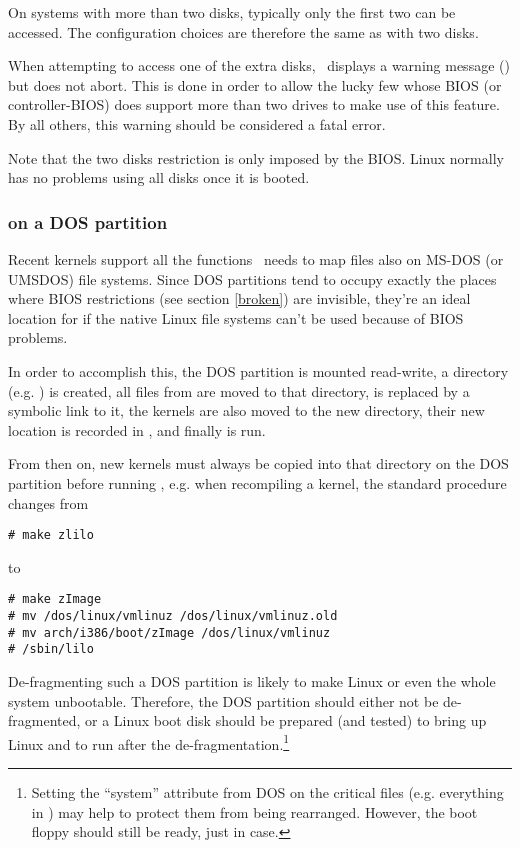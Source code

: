 On systems with more than two disks, typically only the first two can
be accessed. The configuration choices are therefore the same as with
two disks.

When attempting to access one of the extra disks, \LILO\ displays a
warning message () but does not abort. This is done in order to allow
the lucky few whose BIOS (or controller-BIOS) does support more than
two drives to make use of this feature. By all others, this warning
should be considered a fatal error.

Note that the two disks restriction is only imposed by the BIOS.
Linux normally has no problems using all disks once it is booted.


\subsubsection{ on a DOS partition}
\label{viados}

Recent kernels support all the functions \LILO\ needs to map files also
on MS-DOS (or UMSDOS) file systems. Since DOS partitions tend to occupy
exactly the places where BIOS restrictions (see section \ref{broken})
are invisible, they're an ideal location for  if the native
Linux file systems can't be used because of BIOS problems.

In order to accomplish this, the DOS partition is mounted read-write,
a directory (e.g. ) is created, all files from
 are moved to that directory,  is replaced by
a symbolic link to it, the kernels are also moved to the new directory,
their new location is recorded in , and finally
 is run.

From then on, new kernels must always be copied into that directory on
the DOS partition before running , e.g. when recompiling
a kernel, the standard procedure changes from

\begin{verbatim}
# make zlilo
\end{verbatim}

to

\begin{verbatim}
# make zImage
# mv /dos/linux/vmlinuz /dos/linux/vmlinuz.old
# mv arch/i386/boot/zImage /dos/linux/vmlinuz
# /sbin/lilo
\end{verbatim}

 De-fragmenting such a DOS partition is likely to
make Linux or even the whole system unbootable. Therefore, the DOS
partition should either not be de-fragmented, or a Linux boot disk
should be prepared (and tested) to bring up Linux and to run
 after the de-fragmentation.\footnote{Setting the
``system'' attribute from DOS on the critical files (e.g. everything
in ) may help to protect them from being
rearranged. However, the boot floppy should still be ready, just in case.}


